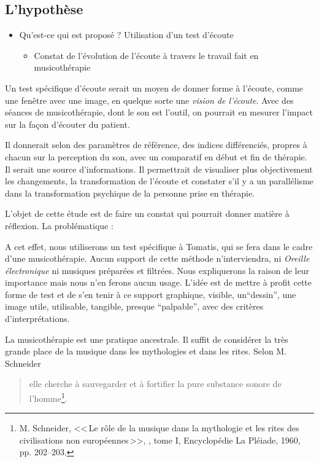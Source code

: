 \subsection{L'hypothèse}

\begin{itemize}
	\item Qu'est-ce qui est proposé ? 
	Utilisation d'un test d'écoute 
	\begin{itemize}
		\item Constat de l'évolution de l'écoute à travers le travail fait en musicothérapie
	\end{itemize}
\end{itemize}


Un test spécifique d'écoute serait  un 
moyen de donner  forme à l'écoute, comme une fenêtre avec une  image, en quelque sorte une \emph{vision de l'écoute}. Avec  des séances de musicothérapie, dont  le son est l'outil, on pourrait en mesurer l'impact sur la façon d'écouter du patient. 

Il  donnerait selon des paramètres de référence, des indices différenciés, propres à chacun sur la perception du son, avec un comparatif en début et fin de thérapie. Il serait  une source d'informations. Il permettrait de visualiser plus objectivement
les changements, la transformation de l'écoute et constater s'il y a un parallélisme dans la transformation psychique  de la personne prise en thérapie.


 L'objet de cette étude est de faire un constat
qui pourrait donner matière à réflexion.
La problématique : 

A cet effet, nous utiliserons un test spécifique à Tomatis, qui se fera dans le cadre d'une musicothérapie. Aucun support de cette méthode n'interviendra, ni \textsl{Oreille
électronique} ni musiques préparées et filtrées. Nous expliquerons la raison de   leur importance mais nous n'en ferons aucun usage. L'idée est de mettre à profit cette forme de test et de  s'en tenir à ce support
graphique, visible, un``dessin'', une image utile, utilisable, tangible,
presque ``palpable'', avec des critères
d'interprétations.


La musicothérapie est une pratique ancestrale. Il suffit de considérer la très grande  place de la musique dans les mythologies et dans les rites.  Selon M. Schneider
\begin{quote}
	elle cherche à sauvegarder et à fortifier la pure substance sonore de l'homme\footnote{M. Schneider, <<\,Le rôle  de la musique dans 
		la mythologie et les rites des civilisations non européennes\,>>,
		\cite{schaeffner.ea:histoire}, tome I, Encyclopédie La Pléiade, 1960, pp. 202--203.}.
\end{quote}

